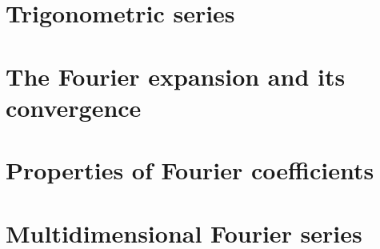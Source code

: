 \section{Trigonometric series}
\section{The Fourier expansion and its convergence}
\section{Properties of Fourier coefficients}
\section{Multidimensional Fourier series}
